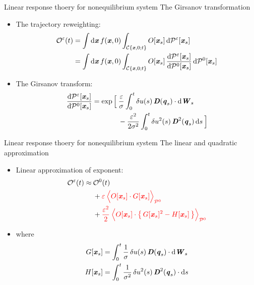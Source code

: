 \documentclass[fleqn]{beamer}
\newcommand{\redc}[1]{{\color{red} #1}}
\newcommand{\bluec}[1]{{\color{blue} #1}}
\newcommand{\vect}[1]{\textbf{\textit{#1}}}
\newcommand{\dd}[0]{\textrm{d}}
\newcommand{\fe}{u}
\newcommand{\eps}{\varepsilon}
\newcommand{\mo}{\mathcal O}
\newcommand{\mc}{\mathcal C}
\newcommand{\pathmeas}{\mathcal P}
\begin{document}
\begin{frame}{Linear response thoery for nonequilibrium system}
  {The Girsanov transformation}
  \begin{itemize}
  \item <1-> The trajectory reweighting:
    \bluec{
      \begin{align*}
        \mo^\eps(t)
        &= \int \dd \vect x\, f(\vect x, 0)
        \int_{\mc\{\vect x,0; t\}} O[\vect x_s]\,\dd \pathmeas^\eps[\vect x_s]\\
        &= \int \dd \vect x\, f(\vect x, 0)
        \int_{\mc\{\vect x,0; t\}} O[\vect x_s]\,
        \frac{\dd\pathmeas^\eps[\vect x_s]}{\dd\pathmeas^0[\vect x_s]}\,
        \dd\pathmeas^0[\vect x_s]
      \end{align*}
    }
  \item<2-> The \redc{Girsanov transform}:
    \bluec{
      \begin{align*}
        \frac{\dd\pathmeas^\eps[\vect x_s]}{\dd\pathmeas^0[\vect x_s]}
        =
        \exp
        \Big[\:&
        \frac{\eps}\sigma\int_0^t
        \delta\fe(s)\,\vect D(\vect q_s)\cdot\dd\vect W_s\\
        &-
        \frac {\eps^2}{2\sigma^2}\int_0^t
        \delta\fe^2(s)\,\vect D^2(\vect q_s)\,\dd s\:
        \Big]
      \end{align*}
    }
  \end{itemize}
\end{frame}



\begin{frame}{Linear response thoery for nonequilibrium system}
  {The linear and quadratic approximation}
  \begin{itemize}
  \item<1-> Linear approximation of exponent:
    \bluec{
      \begin{align*}
        \mo^\eps(t) \approx\: & \mo^0(t)\\
        &+
        \redc{\eps\:
          \Big\langle
          O[\vect x_s]\cdot G[\vect x_s]
          \Big\rangle_{\pathmeas^0}}
        \\
        &+
        \redc{
        \frac{\eps^2}2\:
        \Big\langle
        O[\vect x_s]\cdot \big\{\, G[\vect x_s]^2 - H[\vect x_s]\,\big\}
        \Big\rangle_{\pathmeas^0}}
      \end{align*}
    }
  \item<2-> where
    \bluec{
      \begin{align*}
        G[\vect x_s] & = \int_0^t\frac 1\sigma\,\delta\fe(s)\,\vect D(\vect q_s)\cdot \dd\vect W_s\\
        H[\vect x_s] & = \int_0^t\frac 1{\sigma^2}\,\delta\fe^2(s)\,\vect D^2(\vect q_s)\cdot \dd s
    \end{align*}
    }
  \end{itemize}
\end{frame}
\end{document}
